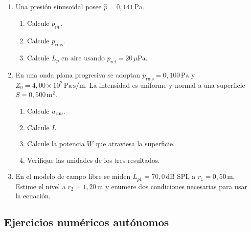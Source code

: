 \begin{enumerate}[label=\textbf{G\arabic*.},leftmargin=*]
    \item Una presión sinusoidal posee
    \(\hat p=0{,}141\,\text{Pa}\).
    \begin{enumerate}[label=\alph*)]
        \item Calcule \(p_\mathrm{pp}\).
        \item Calcule \(p_\mathrm{rms}\).
        \item Calcule \(L_p\) en aire usando
        \(p_\mathrm{ref}=20\,\mu\text{Pa}\).
    \end{enumerate}

    \item En una onda plana progresiva se adoptan
    \(p_\mathrm{rms}=0{,}100\,\text{Pa}\) y
    \(Z_0=4{,}00\times10^2\,\text{Pa}\,\text{s}/\text{m}\).
    La intensidad es uniforme y normal a una superficie
    \(S=0{,}500\,\text{m}^2\).
    \begin{enumerate}[label=\alph*)]
        \item Calcule \(u_\mathrm{rms}\).
        \item Calcule \(I\).
        \item Calcule la potencia \(W\) que atraviesa la superficie.
        \item Verifique las unidades de los tres resultados.
    \end{enumerate}

    \item En el modelo de campo libre se miden
    \(L_{p1}=70{,}0\,\text{dB SPL}\) a
    \(r_1=0{,}50\,\text{m}\). Estime el nivel a
    \(r_2=1{,}20\,\text{m}\) y enumere dos condiciones necesarias para usar
    la ecuación.
\end{enumerate}

\subsection*{Ejercicios numéricos autónomos}

